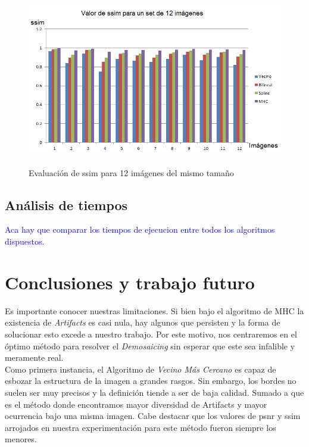 \documentclass[a4paper]{article}
\begin{document}
\begin{figure}[h!]
    \caption{Evaluaci\'on de ssim para 12 im\'agenes del mismo tama\~no}
    \begin{center}
    \includegraphics[scale=0.75]{imagenes/graficos/ssim}
    \label{ssim}
  \end{center}
\end{figure}

\newpage
\subsection{An\'alisis de tiempos}
\textcolor{blue}{Aca hay que comparar los tiempos de ejecucion entre todos los algoritmos dispuestos.}

\newpage
\section{Conclusiones y trabajo futuro}

Es importante conocer nuestras limitaciones. Si bien bajo el algoritmo de MHC la existencia de \emph{Artifacts} es casi nula, hay algunos que persisten y la forma de solucionar esto excede a nuestro trabajo. Por este motivo, nos centraremos en el \'optimo m\'etodo para resolver el \emph{Demosaicing} sin esperar que este sea infalible y meramente real.\\

Como primera instancia, el Algoritmo de\textit{ Vecino M\'as Cercano} es capaz de esbozar la estructura de la imagen a grandes rasgos. Sin embargo, los bordes no suelen ser muy precisos y la definici\'on tiende a ser de baja calidad. Sumado a que es el m\'etodo donde encontramos mayor diversidad de Artifacts y mayor ocurrencia bajo una misma imagen. Cabe destacar que los valores de psnr y ssim arrojados en nuestra experimentaci\'on para este m\'etodo fueron siempre los menores.\\
\end{document}
